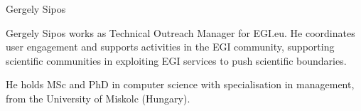 \begin{participant}[type=leadPI,PM=,gender=male]{Gergely Sipos}

    Gergely Sipos works as Technical Outreach Manager for EGI.eu. 
    He coordinates user engagement and supports activities in the EGI community, 
    supporting scientific communities in exploiting EGI services to push scientific 
    boundaries. 

    He holds MSc and PhD in computer science with specialisation in management, 
    from the University of Miskolc (Hungary).

\end{participant}
